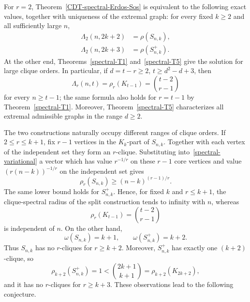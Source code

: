 \documentclass[11pt,a4paper]{article}
\begin{document}
For $r=2$, Theorem~\ref{CDT-spectral-Erdos-Sos} is equivalent to the following exact values, together with uniqueness of the extremal graph: for every fixed $k\ge2$ and all sufficiently large $n$,
\begin{align}
\Lambda_2(n,2k+2)&=\rho(S_{n,k}),\label{Lambda-CDT-even}\\
\Lambda_2(n,2k+3)&=\rho(S_{n,k}^{+}).\label{Lambda-CDT-odd}
\end{align}
At the other end, Theorems~\ref{spectral-T1} and~\ref{spectral-T5} give the solution for large clique orders. In particular, if $d=t-r\ge2$, $t\ge d^2-d+3$, then
\begin{equation}\label{Lambda-large-clique}
\Lambda_r(n,t)=\rho_r(K_{t-1})=\binom{t-2}{r-1}
\end{equation}
for every $n\ge t-1$; the same formula also holds for $r=t-1$ by Theorem~\ref{spectral-T1}. Moreover, Theorem~\ref{spectral-T5} characterizes all extremal admissible graphs in the range $d\ge2$.

The two constructions naturally occupy different ranges of clique orders. If $2\le r\le k+1$, fix $r-1$ vertices in the $K_k$-part of $S_{n,k}$. Together with each vertex of the independent set they form an $r$-clique. Substituting into~\eqref{spectral-variational} a vector which has value $r^{-1/r}$ on these $r-1$ core vertices and value $(r(n-k))^{-1/r}$ on the independent set gives
\begin{equation}\label{split-lower-bound}
\rho_r(S_{n,k})\ge (n-k)^{(r-1)/r}.
\end{equation}
The same lower bound holds for $S_{n,k}^{+}$. Hence, for fixed $k$ and $r\le k+1$, the clique-spectral radius of the split construction tends to infinity with $n$, whereas
\[
\rho_r(K_{t-1})=\binom{t-2}{r-1}
\]
is independent of $n$. On the other hand,
\[
\omega(S_{n,k})=k+1,
\qquad
\omega(S_{n,k}^{+})=k+2.
\]
Thus $S_{n,k}$ has no $r$-cliques for $r\ge k+2$. Moreover, $S_{n,k}^{+}$ has exactly one $(k+2)$-clique, so
\[
\rho_{k+2}(S_{n,k}^{+})=1<\binom{2k+1}{k+1}=\rho_{k+2}(K_{2k+2}),
\]
and it has no $r$-cliques for $r\ge k+3$. These observations lead to the following conjecture.
\end{document}
